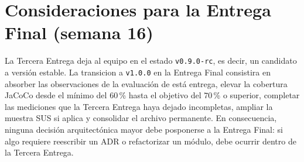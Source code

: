 \documentclass[11pt,a4paper]{article}
\begin{document}
\section{Consideraciones para la Entrega Final (semana 16)}

La Tercera Entrega deja al equipo en el estado \texttt{v0.9.0-rc}, es decir, un candidato a versi\'{o}n estable. La transicion a \texttt{v1.0.0} en la Entrega Final consistira en absorber las observaciones de la evaluaci\'{o}n de est\'{a} entrega, elevar la cobertura JaCoCo desde el m\'{i}nimo del $60$\,\% hasta el objetivo del $70$\,\% o superior, completar las mediciones que la Tercera Entrega haya dejado incompletas, ampliar la muestra SUS si aplica y consolidar el archivo permanente. En consecuencia, ninguna decisi\'{o}n arquitect\'{o}nica mayor debe posponerse a la Entrega Final: si algo requiere reescribir un ADR o refactorizar un m\'{o}dulo, debe ocurrir dentro de la Tercera Entrega.



\end{document}
